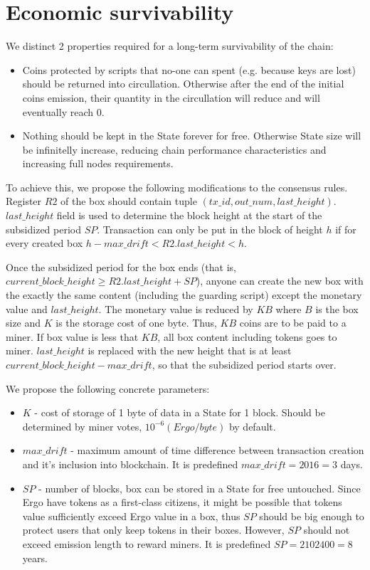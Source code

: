 \section{Economic survivability}

We distinct 2 properties required for a long-term survivability of the chain:

\begin{itemize}
    \item{} Coins protected by scripts that no-one can spent (e.g. because keys are lost)
    should be returned into circullation.
    Otherwise after the end of the initial coins emission, their quantity
    in the circullation will reduce and will eventually reach 0.
    \item{} Nothing should be kept in the State forever for free.
    Otherwise State size will be infinitelly increase, reducing chain performance
    characteristics and increasing full nodes requirements.
\end{itemize}

To achieve this, we propose the following modifications to the consensus rules.
Register $R2$ of the box should contain tuple $(tx\_id, out\_num,
last\_height)$. $last\_height$ field is used to determine the block height
at the start of the subsidized period $SP$. Transaction can only be put in the
block of height $h$ if for every created box $h - max\_drift<R2.last\_height<h$.

Once the subsidized period for the box ends (that is,
$current\_block\_height\ge R2.last\_height + SP$), anyone can
create the new box with the exactly the same content (including the guarding
script) except the monetary value and $last\_height$.  The monetary value is
reduced by $KB$ where $B$ is the box size and $K$ is the storage cost of one byte.
Thus, $KB$ coins are to be paid to a miner.
If box value is less that $KB$, all box content including tokens goes to miner.
$last\_height$ is replaced with the new height that is at least
$current\_block\_height - max\_drift$, so that the subsidized period starts over.

We propose the following concrete parameters:
\begin{itemize}
    \item{} $K$ - cost of storage of 1 byte of data in a State for 1 block.
    Should be determined by miner votes, $10^{-6} (Ergo/byte)$ by default.
    \item{} $max\_drift$ - maximum amount of time difference between transaction
    creation and it's inclusion into blockchain.
    It is predefined $max\_drift = 2016 = 3$ days.
    \item{} $SP$ - number of blocks, box can be stored in a State for free untouched.
    Since Ergo have tokens as a first-class citizens, it might be possible that tokens value
    sufficiently exceed Ergo value in a box, thus $SP$ should be big enough to protect users
    that only keep tokens in their boxes.
    However, $SP$ should not exceed emission length to reward miners.
    It is predefined $SP = 2102400 = 8$ years.
\end{itemize}
